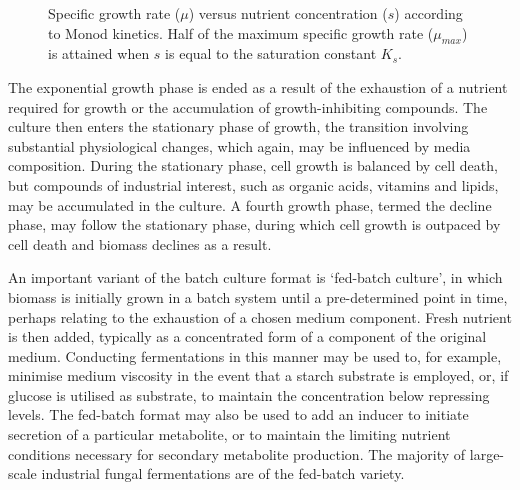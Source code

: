 \begin{figure}[t]
	\centering
  \caption{Specific growth rate ($\mu$) versus nutrient concentration ($s$) according to Monod kinetics. Half of the maximum specific growth rate ($\mu_{max}$) is attained when $s$ is equal to the saturation constant $K_s$.} 
  \label{fig:Monod}
\end{figure}

The exponential growth phase is ended as a result of the exhaustion of a nutrient required for growth or the accumulation of growth-inhibiting compounds. The culture then enters the stationary phase of growth, the transition involving substantial physiological changes, which again, may be influenced by media composition. During the stationary phase, cell growth is balanced by cell death, but compounds of industrial interest, such as organic acids, vitamins and lipids, may be accumulated in the culture. A fourth growth phase, termed the decline phase, may follow the stationary phase, during which cell growth is outpaced by cell death and biomass declines as a result.

An important variant of the batch culture format is \lq fed-batch culture', in which biomass is initially grown in a batch system until a pre-determined point in time, perhaps relating to the exhaustion of a chosen medium component. Fresh nutrient is then added, typically as a concentrated form of a component of the original medium. Conducting fermentations in this manner may be used to, for example, minimise medium viscosity in the event that a starch substrate is employed, or, if glucose is utilised as substrate, to maintain the concentration below repressing levels. The fed-batch format may also be used to add an inducer to initiate secretion of a particular metabolite, or to maintain the limiting nutrient conditions necessary for secondary metabolite production. The majority of large-scale industrial fungal fermentations are of the fed-batch variety.



